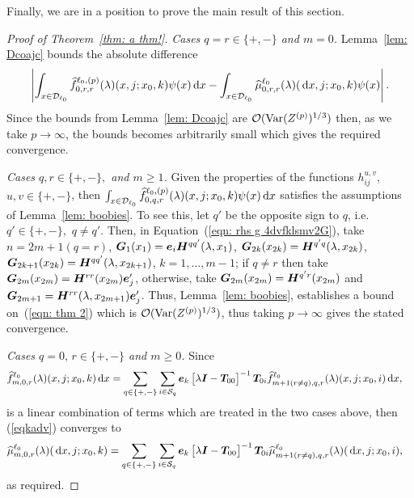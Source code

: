 Finally, we are in a position to prove the main result of this section. 
\begin{proof}[Proof of Theorem~\ref{thm: a thm!}]
	\textit{Cases \(q=r \in \{+,-\}\) and \(m=0\).} Lemma~\ref{lem: Dcoajc} bounds the absolute difference 
	\[\left|\int_{x\in\mathcal{D}_{\ell_0}}\widehat f_{0,r,r}^{\ell_0,(p)}(\lambda)(x,j;x_0,k)\psi(x)\, \mathrm{d} x-\int_{x\in\mathcal{D}_{\ell_0}}\widehat \mu_{0,r,r}^{\ell_0}(\lambda)(\, \mathrm{d} x,j;x_0,k)\psi(x)\right|.\]
	Since the bounds from Lemma~\ref{lem: Dcoajc} are \(\mathcal O(\mathrm{Var}(Z^{(p)})^{1/3})\) then, as we take \(p \to \infty\), the bounds becomes arbitrarily small which gives the required convergence. 

	\textit{Cases \(q,r\in \{+,-\},\) and \(m\geq 1\).} Given the properties of the functions \( h_{ij}^{u,v}\), \(u,v\in\{+,-\}\), then \(\int_{x\in\mathcal{D}_{\ell_0}}\widehat f_{0,q,r}^{\ell_0,(p)}(\lambda)(x,j;x_0,k)\psi(x)\, \mathrm{d} x\) satisfies the assumptions of Lemma~\ref{lem: boobies}. To see this, let \(q'\) be the opposite sign to \(q\), i.e.~\(q'\in\{+,-\},\) \(q\neq q'\). Then, in Equation~(\ref{eqn: rhs g 4dvfklsmv2G}), take \(n=2m+1(q=r)\), \(\boldsymbol G_1(x_1) = \boldsymbol e_i\boldsymbol H^{qq'}(\lambda, x_1)\), \(\boldsymbol G_{2k}(x_{2k}) = \boldsymbol H^{q'q}(\lambda, x_{2k})\), \(\boldsymbol G_{2k+1}(x_{2k}) = \boldsymbol H^{qq'}(\lambda, x_{2k+1})\), \(k=1,\dots,m-1\); if \(q\neq r\) then take \(\boldsymbol G_{2m}(x_{2m}) = \boldsymbol H^{rr}(x_{2m})\boldsymbol e_j'{}\), otherwise, take \(\boldsymbol G_{2m}(x_{2m}) = \boldsymbol H^{q'r}(x_{2m})\) and \(\boldsymbol G_{2m+1} = \boldsymbol H^{rr}(\lambda,x_{2m+1})\boldsymbol e_j'{}\). Thus, Lemma~\ref{lem: boobies}, establishes a bound on~(\ref{eqn: thm 2}) which is \(\mathcal O(\mathrm{Var}(Z^{(p)})^{1/3})\), thus taking \(p\to \infty\) gives the stated convergence. 

	\textit{Cases \(q=0,\, r\in\{+,-\}\) and \(m\geq 0\).} 
	Since
	\begin{align}
		\widehat f_{m,0,r}^{\ell_0}(\lambda)(x,j;x_0,k)  \, \mathrm{d} x
		&= \sum_{q\in\{+,-\}}\sum_{i\in\mathcal{S}_q}\boldsymbol e_k\begin{bmatrix} \lambda \boldsymbol I - \boldsymbol T_{00} \end{bmatrix}^{-1}\boldsymbol T_{0i}\widehat f_{m+1(r\neq q),q,r}^{\ell_0}(\lambda)(x,j;x_0,i)\, \mathrm{d} x, \label{eqkadv}
	\end{align}
	is a linear combination of terms which are treated in the two cases above, then (\ref{eqkadv}) converges to 
	\begin{align}
		\widehat \mu_{m,0,r}^{\ell_0}(\lambda)(\, \mathrm{d} x,j;x_0,k) 
		&= \sum_{q\in\{+,-\}}\sum_{i\in\mathcal{S}_q}\boldsymbol e_k\begin{bmatrix} \lambda \boldsymbol I - \boldsymbol T_{00} \end{bmatrix}^{-1}\boldsymbol T_{0i}\widehat \mu_{m+1(r\neq q),q,r}^{\ell_0}(\lambda)(\, \mathrm{d} x,j;x_0,i),
	\end{align}
	as required. 
\end{proof}


